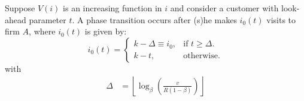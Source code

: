 \begin{theorem} Suppose $V(i)$ is an increasing function in $i$ and consider a customer with look-ahead parameter $t$. A phase transition occurs after (s)he makes $i_0(t)$ visits to firm $A$, where $i_0(t)$ is given by:
\begin{equation}
  i_0(t)=\begin{cases}
    k-\Delta \equiv i_0, & \text{if $t \geq \Delta$}.\\
    k-t, & \text{otherwise}.
  \end{cases}
\end{equation}
with 
\begin{align}
\Delta &= \left\lfloor \log_{\beta}\left(\frac{v}{R(1-\beta)}\right)\right\rfloor
\end{align}
\end{theorem}

